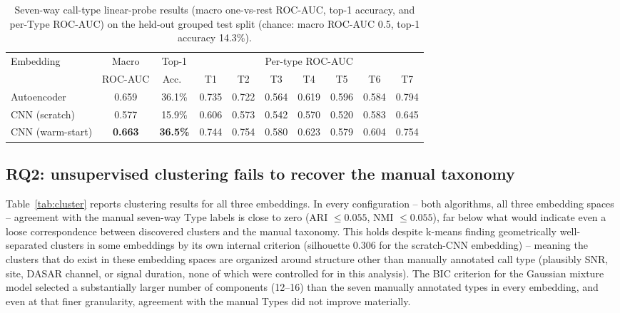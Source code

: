 \documentclass{article}
\begin{document}
\begin{table}[t]
  \centering
  \caption{Seven-way call-type linear-probe results (macro one-vs-rest
  ROC-AUC, top-1 accuracy, and per-Type ROC-AUC) on the held-out grouped
  test split (chance: macro ROC-AUC 0.5, top-1 accuracy 14.3\%).}
  \label{tab:probe}
  \small
  \setlength{\tabcolsep}{4pt}
  \begin{tabular}{lccccccccc}
    \toprule
    Embedding & Macro & Top-1 & \multicolumn{7}{c}{Per-type ROC-AUC} \\
    & ROC-AUC & Acc.\ & T1 & T2 & T3 & T4 & T5 & T6 & T7 \\
    \midrule
    Autoencoder    & 0.659 & 36.1\% & 0.735 & 0.722 & 0.564 & 0.619 & 0.596 & 0.584 & 0.794 \\
    CNN (scratch)      & 0.577 & 15.9\% & 0.606 & 0.573 & 0.542 & 0.570 & 0.520 & 0.583 & 0.645 \\
    CNN (warm-start)   & \textbf{0.663} & \textbf{36.5\%} & 0.744 & 0.754 & 0.580 & 0.623 & 0.579 & 0.604 & 0.754 \\
    \bottomrule
  \end{tabular}
\end{table}

\subsection{RQ2: unsupervised clustering fails to recover the manual taxonomy}

Table~\ref{tab:cluster} reports clustering results for all three
embeddings. In every configuration -- both algorithms, all three embedding
spaces -- agreement with the manual seven-way Type labels is close to
zero (ARI $\leq 0.055$, NMI $\leq 0.055$), far below what would indicate
even a loose correspondence between discovered clusters and the manual
taxonomy. This holds despite k-means finding geometrically well-separated
clusters in some embeddings by its own internal criterion (silhouette
0.306 for the scratch-CNN embedding) -- meaning the clusters that do
exist in these embedding spaces are organized around structure other than
manually annotated call type (plausibly SNR, site, DASAR channel, or
signal duration, none of which were controlled for in this analysis). The
BIC criterion for the Gaussian mixture model selected a substantially
larger number of components (12--16) than the seven manually annotated
types in every embedding, and even at that finer granularity, agreement
with the manual Types did not improve materially.
\end{document}
